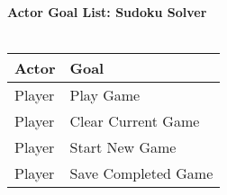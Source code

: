\documentclass[letterpaper]{article}
\begin{document}
\noindent
\textbf{Actor Goal List:  Sudoku Solver}\\\\
\vspace{4ex}
\begin{tabular}{|p{5cm}|p{5cm}|}\hline
\textbf{Actor} & \textbf{Goal}\\\hline
Player & Play Game\\\hline
Player & Clear Current Game\\\hline
Player & Start New Game\\\hline
Player & Save Completed Game\\\hline
\end{tabular}
\end{document}

